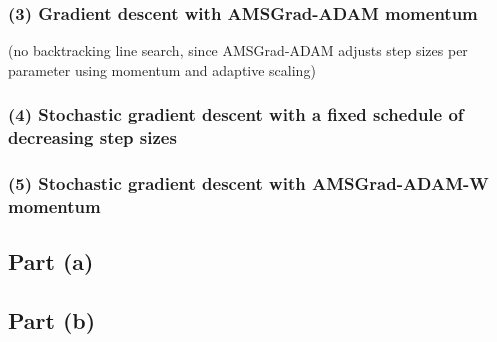 \documentclass[
  letterpaper,
  DIV=11,
  numbers=noendperiod]{scrartcl}
\begin{document}
\subsubsection{(3) Gradient descent with AMSGrad-ADAM
momentum}\label{gradient-descent-with-amsgrad-adam-momentum}

(no backtracking line search, since AMSGrad-ADAM adjusts step sizes per
parameter using momentum and adaptive scaling)

\subsubsection{(4) Stochastic gradient descent with a fixed schedule of
decreasing step
sizes}\label{stochastic-gradient-descent-with-a-fixed-schedule-of-decreasing-step-sizes}

\subsubsection{(5) Stochastic gradient descent with AMSGrad-ADAM-W
momentum}\label{stochastic-gradient-descent-with-amsgrad-adam-w-momentum}

\subsection{Part (a)}\label{part-a}

\subsection{Part (b)}\label{part-b}
\end{document}
